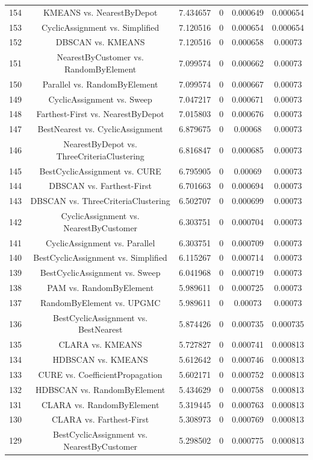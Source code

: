 \documentclass[a4paper,10pt]{article}
\begin{document}
\begin{landscape}
\begin{table}[!htp]
\begin{tabular}{cccccc}
154&KMEANS vs. NearestByDepot&7.434657&0&0.000649&0.000654\\
153&CyclicAssignment vs. Simplified&7.120516&0&0.000654&0.000654\\
152&DBSCAN vs. KMEANS&7.120516&0&0.000658&0.00073\\
151&NearestByCustomer vs. RandomByElement&7.099574&0&0.000662&0.00073\\
150&Parallel vs. RandomByElement&7.099574&0&0.000667&0.00073\\
149&CyclicAssignment vs. Sweep&7.047217&0&0.000671&0.00073\\
148&Farthest-First vs. NearestByDepot&7.015803&0&0.000676&0.00073\\
147&BestNearest vs. CyclicAssignment&6.879675&0&0.00068&0.00073\\
146&NearestByDepot vs. ThreeCriteriaClustering&6.816847&0&0.000685&0.00073\\
145&BestCyclicAssignment vs. CURE&6.795905&0&0.00069&0.00073\\
144&DBSCAN vs. Farthest-First&6.701663&0&0.000694&0.00073\\
143&DBSCAN vs. ThreeCriteriaClustering&6.502707&0&0.000699&0.00073\\
142&CyclicAssignment vs. NearestByCustomer&6.303751&0&0.000704&0.00073\\
141&CyclicAssignment vs. Parallel&6.303751&0&0.000709&0.00073\\
140&BestCyclicAssignment vs. Simplified&6.115267&0&0.000714&0.00073\\
139&BestCyclicAssignment vs. Sweep&6.041968&0&0.000719&0.00073\\
138&PAM vs. RandomByElement&5.989611&0&0.000725&0.00073\\
137&RandomByElement vs. UPGMC&5.989611&0&0.00073&0.00073\\
136&BestCyclicAssignment vs. BestNearest&5.874426&0&0.000735&0.000735\\
135&CLARA vs. KMEANS&5.727827&0&0.000741&0.000813\\
134&HDBSCAN vs. KMEANS&5.612642&0&0.000746&0.000813\\
133&CURE vs. CoefficientPropagation&5.602171&0&0.000752&0.000813\\
132&HDBSCAN vs. RandomByElement&5.434629&0&0.000758&0.000813\\
131&CLARA vs. RandomByElement&5.319445&0&0.000763&0.000813\\
130&CLARA vs. Farthest-First&5.308973&0&0.000769&0.000813\\
129&BestCyclicAssignment vs. NearestByCustomer&5.298502&0&0.000775&0.000813\\

\end{tabular}
\end{table}
\end{landscape}
\end{document}
